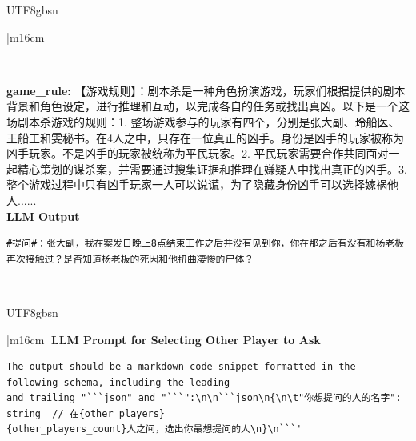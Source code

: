 \documentclass[11pt]{article}
\begin{document}
{\begin{CJK}{UTF8}{gbsn}
\begin{table}[ht!]
\begin{tabular}{|m{16cm}|}
\begin{minipage}[t]{\linewidth}
\begin{verbatim}
\end{verbatim}
\end{minipage} \\
 \textbf{   game\_rule:} \small【游戏规则】：剧本杀是一种角色扮演游戏，玩家们根据提供的剧本背景和角色设定，进行推理和互动，以完成各自的任务或找出真凶。以下是一个这场剧本杀游戏的规则：1. 整场游戏参与的玩家有四个，分别是张大副、玲船医、王船工和雯秘书。在4人之中，只存在一位真正的凶手。身份是凶手的玩家被称为凶手玩家。不是凶手的玩家被统称为平民玩家。2. 平民玩家需要合作共同面对一起精心策划的谋杀案，并需要通过搜集证据和推理在嫌疑人中找出真正的凶手。3. 整个游戏过程中只有凶手玩家一人可以说谎，为了隐藏身份凶手可以选择嫁祸他人......\\

\hline
{}  \textbf{LLM Output}  \\
\hline
\begin{minipage}[t]{\linewidth}
\small\begin{verbatim}
#提问#：张大副，我在案发日晚上8点结束工作之后并没有见到你，你在那之后有没有和杨老板再次接触过？是否知道杨老板的死因和他扭曲凄惨的尸体？

\end{verbatim}
\end{minipage} \\
\hline
\end{tabular}
\caption{LLM prompt and output for asking questions.}
\label{table:prompt_asking_question_cn}
\end{table}
\end{CJK}

\begin{CJK}{UTF8}{gbsn}
\begin{table}[ht!]
\centering
\begin{tabular}{|m{16cm}|}
\hline
{}  {\textbf{LLM Prompt for Selecting Other Player to Ask}} \\
\begin{minipage}[t]{\linewidth}
\small\begin{verbatim}
The output should be a markdown code snippet formatted in the following schema, including the leading
and trailing "```json" and "```":\n\n```json\n{\n\t"你想提问的人的名字": string  // 在{other_players}
{other_players_count}人之间，选出你最想提问的人\n}\n```'


\end{verbatim}
\end{minipage}
\end{tabular}
\end{table}
\end{CJK}}
\end{document}
